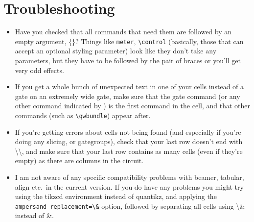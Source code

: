 \documentclass[aps,pra,10pt,nofootinbib]{revtex4-2}
\begin{document}
\section{Troubleshooting}\label{sec:trouble}
\begin{itemize}
  \item Have you checked that all commands that need them are followed by an empty argument, \{\}? Things like \verb!meter!, \verb!\control! (basically, those that can accept an optional styling parameter) look like they don't take any parameters, but they have to be followed by the pair of braces or you'll get very odd effects.
  \item If you get a whole bunch of unexpected text in one of your cells instead of a gate on an extremely wide gate, make sure that the gate command (or any other command indicated by \faToggleOn) is the first command in the cell, and that other commands (such as \verb!\qwbundle!) appear after.
  \item If you're getting errors about cells not being found (and especially if you're doing any slicing, or gategroups), check that your last row doesn't end with \textbackslash\textbackslash, and make sure that your last row contains as many cells (even if they're empty) as there are columns in the circuit.
  \item I am not aware of any specific compatibility problems with beamer, tabular, align etc.\ in the current version. If you do have any problems you might try using the tikzcd environment instead of quantikz, and applying the \texttt{ampersand replacement=\textbackslash\&} option, followed by separating all cells using \textbackslash\& instead of \&.

\end{itemize}
\end{document}
